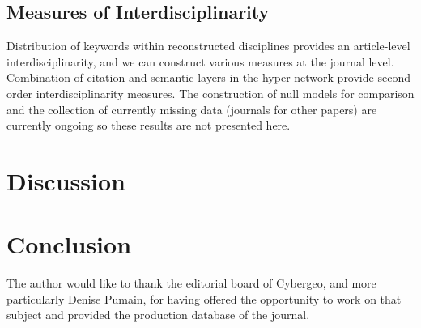 \subsection{Measures of Interdisciplinarity}





Distribution of keywords within reconstructed disciplines provides an article-level interdisciplinarity, and we can construct various measures at the journal level. Combination of citation and semantic layers in the hyper-network provide second order interdisciplinarity measures. The construction of null models for comparison and the collection of currently missing data (journals for other papers) are currently ongoing so these results are not presented here.














\section{Discussion}
\label{sec:discussion}










\section{Conclusion}
\label{sec:discussion}













\begin{acknowledgements}
The author would like to thank the editorial board of Cybergeo, and more particularly Denise Pumain, for having offered the opportunity to work on that subject and provided the production database of the journal. 
\end{acknowledgements}





